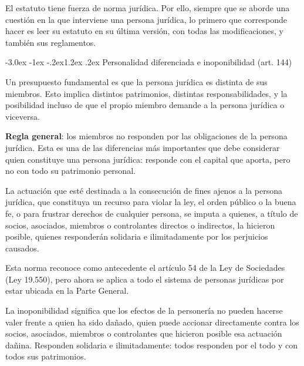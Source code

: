 \documentclass[12pt,oneside]{book}
\makeatletter
\renewcommand\section{\@startsection{section}{1}{\z@}%
  {-3.0ex \@plus -1ex \@minus -.2ex}{1.2ex \@plus .2ex}%
  {\normalfont\large\bfseries\color{acento}}}
\makeatother
\begin{document}
El estatuto tiene fuerza de norma jurídica. Por ello, siempre que se aborde una cuestión en la que interviene una persona jurídica, lo primero que corresponde hacer es leer su estatuto en su última versión, con todas las modificaciones, y también sus reglamentos.

\section{Personalidad diferenciada e inoponibilidad (art. 144)}

Un presupuesto fundamental es que la persona jurídica es distinta de sus miembros. Esto implica distintos patrimonios, distintas responsabilidades, y la posibilidad incluso de que el propio miembro demande a la persona jurídica o viceversa.

\begin{importante}
\textbf{Regla general}: los miembros no responden por las obligaciones de la persona jurídica. Esta es una de las diferencias más importantes que debe considerar quien constituye una persona jurídica: responde con el capital que aporta, pero no con todo su patrimonio personal.
\end{importante}

\begin{definicion}
La actuación que esté destinada a la consecución de fines ajenos a la persona jurídica, que constituya un recurso para violar la ley, el orden público o la buena fe, o para frustrar derechos de cualquier persona, se imputa a quienes, a título de socios, asociados, miembros o controlantes directos o indirectos, la hicieron posible, quienes responderán solidaria e ilimitadamente por los perjuicios causados.
\end{definicion}

Esta norma reconoce como antecedente el artículo 54 de la Ley de Sociedades (Ley 19.550), pero ahora se aplica a todo el sistema de personas jurídicas por estar ubicada en la Parte General.

La inoponibilidad significa que los efectos de la personería no pueden hacerse valer frente a quien ha sido dañado, quien puede accionar directamente contra los socios, asociados, miembros o controlantes que hicieron posible esa actuación dañina. Responden solidaria e ilimitadamente: todos responden por el todo y con todos sus patrimonios.

\end{document}
